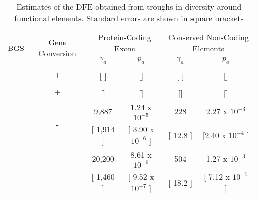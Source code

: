 

\begin{table}[h]
\caption{Estimates of the DFE obtained from troughs in diversity around functional elements. Standard errors are shown in square brackets}
\centering
	\label{EstimatesCastaneus}
        \begin{tabular}{cccccc}

        \hline
             \multirow{2}{*}{BGS}& \multirow{2}{*}{Gene Conversion} & \multicolumn{2}{c}{Protein-Coding Exons} & \multicolumn{2}{c}{Conserved Non-Coding Elements}  \\
 & & $\gamma_a$ & $p_a$ &$\gamma_a$ & $p_a$  \\ [0.5ex] \hline
 
 \multirow{2}{*}{+} & \multirow{2}{*}{+} & & & &  \\
   &  &  [ ]& []& [  ] & []\\ \hdashline
 
 \multirow{2}{*}{-} & \multirow{2}{*}{+} &   &  & & \\
   &  &  []& []& [] & []\\ \hdashline

 \multirow{2}{*}{+} & \multirow{2}{*}{-} &  9,887 & 1.24 x $10^{-5}$ & 228 & 2.27 x $10^{-3}$ \\
   &  &  [ 1,914 ] & [ 3.90 x $10^{-6}$ ]& [ 12.8 ] & [2.40 x $10^{-4}$ ]\\ \hdashline
   
 \multirow{2}{*}{-} & \multirow{2}{*}{-} &  20,200 & 8.61 x $10^{-6}$ & 504 & 1.27 x $10^{-3}$ \\
  &  & [ 1,460 ] & [ 9.52 x $10^{-7}$ ]& [ 18.2 ] & [ 7.12 x $10^{-5}$ ]\\ \hline

        \end{tabular}
    \label{tab:Table2}
    
\end{table}

\linespread{1}
